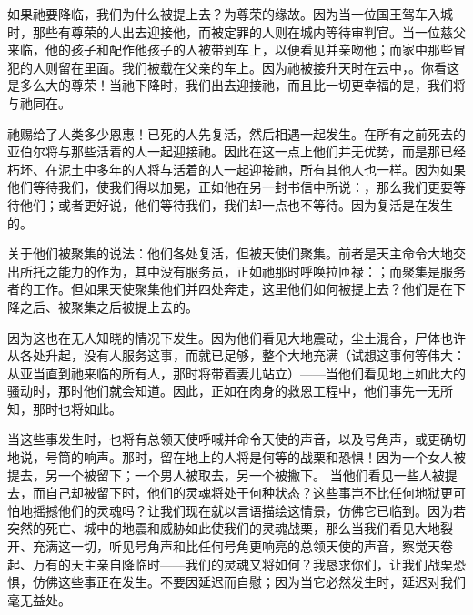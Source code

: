 如果祂要降临，我们为什么被提上去？为尊荣的缘故。因为当一位国王驾车入城时，那些有尊荣的人出去迎接他，而被定罪的人则在城内等待审判官。当一位慈父来临，他的孩子和配作他孩子的人被带到车上，以便看见并亲吻他；而家中那些冒犯的人则留在里面。我们被载在父亲的车上。因为祂被接升天时在云中，。你看这是多么大的尊荣！当祂下降时，我们出去迎接祂，而且比一切更幸福的是，我们将与祂同在。\par

祂赐给了人类多少恩惠！已死的人先复活，然后相遇一起发生。在所有之前死去的亚伯尔将与那些活着的人一起迎接祂。因此在这一点上他们并无优势，而是那已经朽坏、在泥土中多年的人将与活着的人一起迎接祂，所有其他人也一样。因为如果他们等待我们，使我们得以加冕，正如他在另一封书信中所说：，那么我们更要等待他们；或者更好说，他们等待我们，我们却一点也不等待。因为复活是在发生的。\par

关于他们被聚集的说法：他们各处复活，但被天使们聚集。前者是天主命令大地交出所托之能力的作为，其中没有服务员，正如祂那时呼唤拉匝禄：；而聚集是服务者的工作。但如果天使聚集他们并四处奔走，这里他们如何被提上去？他们是在下降之后、被聚集之后被提上去的。\par

因为这也在无人知晓的情况下发生。因为他们看见大地震动，尘土混合，尸体也许从各处升起，没有人服务这事，而就已足够，整个大地充满（试想这事何等伟大：从亚当直到祂来临的所有人，那时将带着妻儿站立）——当他们看见地上如此大的骚动时，那时他们就会知道。因此，正如在肉身的救恩工程中，他们事先一无所知，那时也将如此。\par

当这些事发生时，也将有总领天使呼喊并命令天使的声音，以及号角声，或更确切地说，号筒的响声。那时，留在地上的人将是何等的战栗和恐惧！因为一个女人被提去，另一个被留下；一个男人被取去，另一个被撇下。 当他们看见一些人被提去，而自己却被留下时，他们的灵魂将处于何种状态？这些事岂不比任何地狱更可怕地摇撼他们的灵魂吗？让我们现在就以言语描绘这情景，仿佛它已临到。因为若突然的死亡、城中的地震和威胁如此使我们的灵魂战栗，那么当我们看见大地裂开、充满这一切，听见号角声和比任何号角更响亮的总领天使的声音，察觉天卷起、万有的天主亲自降临时——我们的灵魂又将如何？我恳求你们，让我们战栗恐惧，仿佛这些事正在发生。不要因延迟而自慰；因为当它必然发生时，延迟对我们毫无益处。\par

